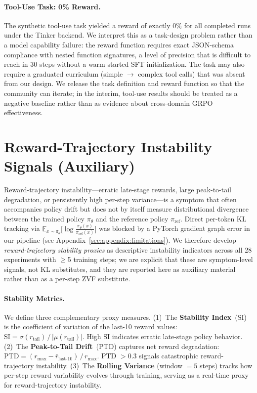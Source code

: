 \documentclass{article}
\begin{document}
\paragraph{Tool-Use Task: 0\% Reward.}
The synthetic tool-use task yielded a reward of exactly 0\% for all completed
runs under the Tinker backend. We interpret this as a task-design problem
rather than a model capability failure: the reward function requires exact
JSON-schema compliance with nested function signatures, a level of precision
that is difficult to reach in 30 steps without a warm-started SFT initialization.
The task may also require a graduated curriculum (simple $\to$ complex tool calls)
that was absent from our design. We release the task definition and reward
function so that the community can iterate; in the interim, tool-use results
should be treated as a negative baseline rather than as evidence about
cross-domain GRPO effectiveness.

\section{Reward-Trajectory Instability Signals (Auxiliary)}
\label{sec:appendix:instability}

Reward-trajectory instability---erratic late-stage rewards, large peak-to-tail
degradation, or persistently high per-step variance---is a symptom that often
accompanies policy drift but does not by itself measure distributional
divergence between the trained policy $\pi_\theta$ and the reference policy
$\pi_{\mathrm{ref}}$. Direct per-token KL tracking via $\mathbb{E}_{x \sim
\pi_\theta}\big[\log \frac{\pi_\theta(x)}{\pi_{\mathrm{ref}}(x)}\big]$ was
blocked by a PyTorch gradient graph error in our pipeline (see
Appendix~\ref{sec:appendix:limitations}). We therefore develop \emph{reward-trajectory
stability proxies} as descriptive instability indicators across all 28
experiments with $\geq$5 training steps; we are explicit that these are
symptom-level signals, not KL substitutes, and they are reported here as
auxiliary material rather than as a per-step ZVF substitute.

\paragraph{Stability Metrics.}
We define three complementary proxy measures.
(1)~The \textbf{Stability Index}~(SI) is the coefficient of variation of
the last-10 reward values:
$\mathrm{SI} = \sigma(r_{\text{tail}}) \,/\, |\mu(r_{\text{tail}})|$.
High SI indicates erratic late-stage policy behavior.
(2)~The \textbf{Peak-to-Tail Drift}~(PTD) captures net reward degradation:
$\mathrm{PTD} = (r_{\max} - \bar{r}_{\text{last-10}}) \,/\, r_{\max}$.
PTD $> 0.3$ signals catastrophic reward-trajectory instability.
(3)~The \textbf{Rolling Variance} (window $= 5$ steps) tracks how
per-step reward variability evolves through training, serving as a
real-time proxy for reward-trajectory instability.
\end{document}
